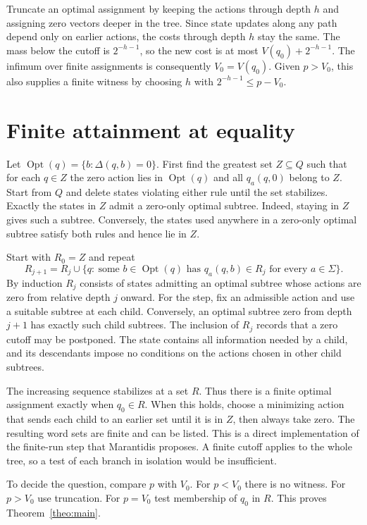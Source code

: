 \documentclass[11pt,a4paper]{amsart}
\begin{document}
Truncate an optimal assignment by keeping the actions through depth \(h\) and assigning zero vectors deeper in the tree. Since state updates along any path depend only on earlier actions, the costs through depth \(h\) stay the same. The mass below the cutoff is \(2^{-h-1}\), so the new cost is at most \(V(q_0)+2^{-h-1}\). The infimum over finite assignments is consequently \(V_0=V(q_0)\). Given \(p>V_0\), this also supplies a finite witness by choosing \(h\) with \(2^{-h-1}\le p-V_0\).

\section{Finite attainment at equality}
Let \(\operatorname{Opt}(q)=\{b:\Delta(q,b)=0\}\). First find the greatest set \(Z\subseteq Q\) such that for each \(q\in Z\) the zero action lies in \(\operatorname{Opt}(q)\) and all \(q_a(q,0)\) belong to \(Z\). Start from \(Q\) and delete states violating either rule until the set stabilizes. Exactly the states in \(Z\) admit a zero-only optimal subtree. Indeed, staying in \(Z\) gives such a subtree. Conversely, the states used anywhere in a zero-only optimal subtree satisfy both rules and hence lie in \(Z\).

Start with \(R_0=Z\) and repeat
\[
 R_{j+1}=R_j\cup\{q:\ \text{some }b\in\operatorname{Opt}(q)
                     \text{ has }q_a(q,b)\in R_j\text{ for every }a\in\Sigma\}.
\]
By induction \(R_j\) consists of states admitting an optimal subtree whose actions are zero from relative depth \(j\) onward. For the step, fix an admissible action and use a suitable subtree at each child. Conversely, an optimal subtree zero from depth \(j+1\) has exactly such child subtrees. The inclusion of \(R_j\) records that a zero cutoff may be postponed. The state contains all information needed by a child, and its descendants impose no conditions on the actions chosen in other child subtrees.

The increasing sequence stabilizes at a set \(R\). Thus there is a finite optimal assignment exactly when \(q_0\in R\). When this holds, choose a minimizing action that sends each child to an earlier set until it is in \(Z\), then always take zero. The resulting word sets are finite and can be listed. This is a direct implementation of the finite-run step that Marantidis proposes. A finite cutoff applies to the whole tree, so a test of each branch in isolation would be insufficient.

To decide the question, compare \(p\) with \(V_0\). For \(p<V_0\) there is no witness. For \(p>V_0\) use truncation. For \(p=V_0\) test membership of \(q_0\) in \(R\). This proves Theorem~\ref{theo:main}.
\end{document}

